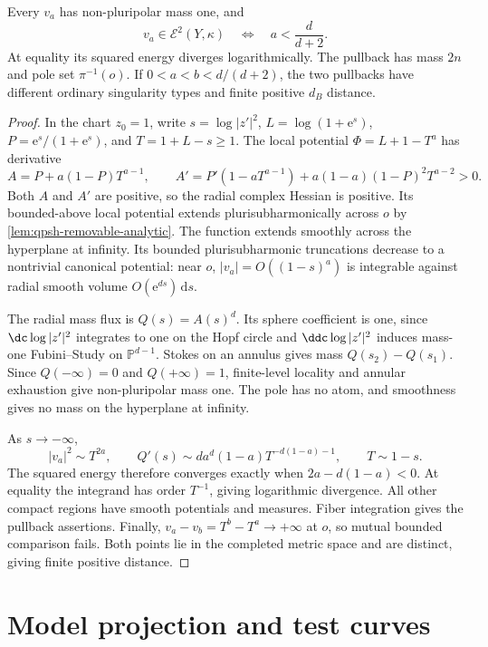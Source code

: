 \begin{proposition}\label{prop:hopf-singular-basic-energy}
Every $v_a$ has non-pluripolar mass one, and
\[
 v_a\in\mathcal E^2(Y,\kappa)
 \quad\Longleftrightarrow\quad a<\frac d{d+2}.
\]
At equality its squared energy diverges logarithmically. The pullback has mass $2n$ and pole set $\pi^{-1}(o)$. If $0<a<b<d/(d+2)$, the two pullbacks have different ordinary singularity types and finite positive $d_B$ distance.
\end{proposition}
\begin{proof}
In the chart $z_0=1$, write $s=\log|z'|^2$, $L=\log(1+\mathrm e^s)$, $P=\mathrm e^s/(1+\mathrm e^s)$, and $T=1+L-s\geq1$. The local potential $\Phi=L+1-T^a$ has derivative
\[
 A=P+a(1-P)T^{a-1},\qquad
 A'=P'(1-aT^{a-1})+a(1-a)(1-P)^2T^{a-2}>0.
\]
Both $A$ and $A'$ are positive, so the radial complex Hessian is positive. Its bounded-above local potential extends plurisubharmonically across $o$ by \cref{lem:qpsh-removable-analytic}. The function extends smoothly across the hyperplane at infinity. Its bounded plurisubharmonic truncations decrease to a nontrivial canonical potential: near $o$, $|v_a|=O((1-s)^a)$ is integrable against radial smooth volume $O(\mathrm e^{ds})\,\mathrm ds$.

The radial mass flux is $Q(s)=A(s)^d$. Its sphere coefficient is one, since $\dc\log|z'|^2$ integrates to one on the Hopf circle and $\ddc\log|z'|^2$ induces mass-one Fubini--Study on $\mathbb P^{d-1}$. Stokes on an annulus gives mass $Q(s_2)-Q(s_1)$. Since $Q(-\infty)=0$ and $Q(+\infty)=1$, finite-level locality and annular exhaustion give non-pluripolar mass one. The pole has no atom, and smoothness gives no mass on the hyperplane at infinity.

As $s\to-\infty$,
\[
 |v_a|^2\sim T^{2a},\qquad
 Q'(s)\sim d a^d(1-a)T^{-d(1-a)-1},\qquad T\sim1-s.
\]
The squared energy therefore converges exactly when $2a-d(1-a)<0$. At equality the integrand has order $T^{-1}$, giving logarithmic divergence. All other compact regions have smooth potentials and measures. Fiber integration gives the pullback assertions. Finally, $v_a-v_b=T^b-T^a\to+\infty$ at $o$, so mutual bounded comparison fails. Both points lie in the completed metric space and are distinct, giving finite positive distance.
\end{proof}

\section{Model projection and test curves}
\label{sec:hopf-basic-models}

